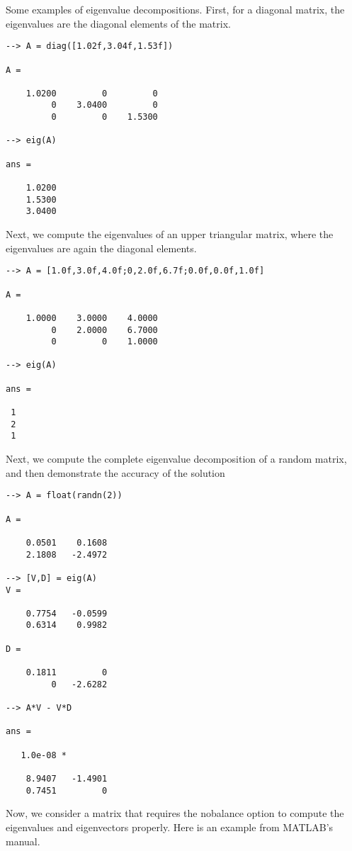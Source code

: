 Some examples of eigenvalue decompositions.  First, for a diagonal
matrix, the eigenvalues are the diagonal elements of the matrix.
\begin{verbatim}
--> A = diag([1.02f,3.04f,1.53f])

A = 

    1.0200         0         0 
         0    3.0400         0 
         0         0    1.5300 

--> eig(A)

ans = 

    1.0200 
    1.5300 
    3.0400 
\end{verbatim}
Next, we compute the eigenvalues of an upper triangular matrix, 
where the eigenvalues are again the diagonal elements.
\begin{verbatim}
--> A = [1.0f,3.0f,4.0f;0,2.0f,6.7f;0.0f,0.0f,1.0f]

A = 

    1.0000    3.0000    4.0000 
         0    2.0000    6.7000 
         0         0    1.0000 

--> eig(A)

ans = 

 1 
 2 
 1 
\end{verbatim}
Next, we compute the complete eigenvalue decomposition of
a random matrix, and then demonstrate the accuracy of the solution
\begin{verbatim}
--> A = float(randn(2))

A = 

    0.0501    0.1608 
    2.1808   -2.4972 

--> [V,D] = eig(A)
V = 

    0.7754   -0.0599 
    0.6314    0.9982 

D = 

    0.1811         0 
         0   -2.6282 

--> A*V - V*D

ans = 

   1.0e-08 * 

    8.9407   -1.4901 
    0.7451         0 
\end{verbatim}
Now, we consider a matrix that requires the nobalance option
to compute the eigenvalues and eigenvectors properly.  Here is
an example from MATLAB's manual.
